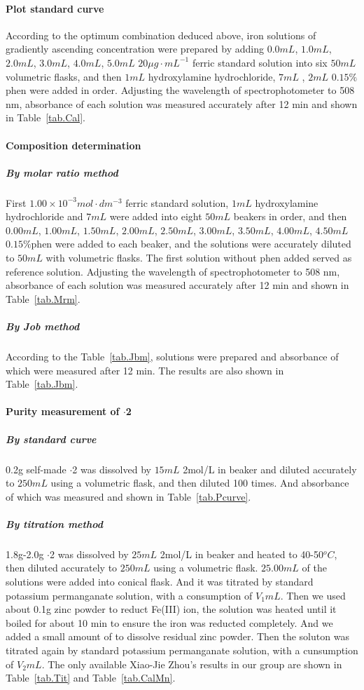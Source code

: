 \paragraph{Plot standard curve}
According to the optimum combination deduced above, iron solutions of gradiently ascending concentration were prepared by adding $0.0mL$, $1.0mL$, $2.0mL$, $3.0mL$, $4.0mL$, $5.0mL$ $20\mu g\cdot mL^{-1}$ ferric standard solution into six $50mL$ volumetric flasks, and then $1mL$ hydroxylamine hydrochloride, $7mL$ , $2mL$ $0.15\%$phen were added in order. Adjusting the wavelength of spectrophotometer to 508 nm, absorbance of each solution was measured accurately after 12 min and shown in Table~\ref{tab.Cal}.

\paragraph{Composition determination}

\subparagraph{By molar ratio method}
First $1.00\times10^{-3} mol\cdot dm^{-3}$ ferric standard solution, $1mL$ hydroxylamine hydrochloride and $7mL$ were added into eight $50mL$ beakers in order, and then $0.00mL$, $1.00mL$, $1.50mL$, $2.00mL$, $2.50mL$, $3.00mL$, $3.50mL$, $4.00mL$, $4.50mL$ $0.15\%$phen were added to each beaker, and the solutions were accurately diluted to $50mL$ with volumetric flasks. The first solution without phen added served as reference solution. Adjusting the wavelength of spectrophotometer to 508 nm, absorbance of each solution was measured accurately after 12 min and shown in Table~\ref{tab.Mrm}.

\subparagraph{By Job method}
According to the Table~\ref{tab.Jbm}, solutions were prepared and absorbance of which were measured after 12 min. The results are also shown in Table~\ref{tab.Jbm}.
\newpage
\paragraph{Purity measurement of $\cdot$2}

\subparagraph{By standard curve}
0.2g self-made $\cdot$2 was dissolved by $15mL$ 2mol/L  in beaker and diluted accurately to $250mL$ using a volumetric flask, and then diluted 100 times. And absorbance of which was measured and shown in Table~\ref{tab.Pcurve}.

\subparagraph{By titration method}
1.8g-2.0g $\cdot$2 was dissolved by $25mL$ 2mol/L  in beaker and heated to 40-50$^oC$, then diluted accurately to $250mL$ using a volumetric flask. $25.00mL$ of the solutions were added into conical flask. And it was titrated by standard potassium permanganate solution, with a consumption of $V_1mL$. Then we used about 0.1g zinc powder to reduct Fe(III) ion, the solution was heated until it boiled for about 10 min to ensure the iron was reducted completely. And we added a small amount of  to dissolve residual zinc powder. Then the soluton was titrated again by standard potassium permanganate solution, with a cunsumption of $V_2mL$. The only available Xiao-Jie Zhou's results in our group are shown in Table~\ref{tab.Tit} and Table~\ref{tab.CalMn}.

\ifx\SUM\undefined


\fi